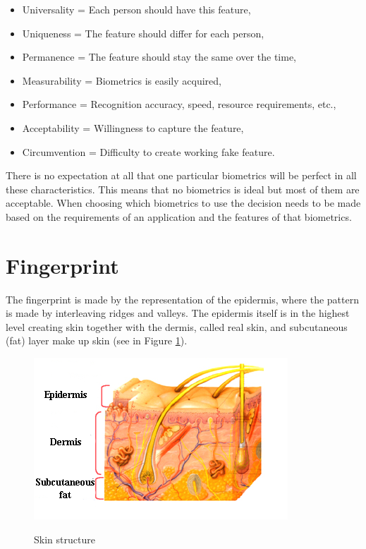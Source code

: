 \begin{itemize}
    \setlength\itemsep{0.2em}
    \item Universality = Each person should have this feature,
    \item Uniqueness = The feature should differ for each person,
    \item Permanence = The feature should stay the same over the time,
    \item Measurability = Biometrics is easily acquired,
    \item Performance = Recognition accuracy, speed, resource requirements, etc.,
    \item Acceptability = Willingness to capture the feature,
    \item Circumvention = Difficulty to create working fake feature. \cite{maltoni2009handbook} \cite{jain2007handbook} \cite{01BioPrednaska}
\end{itemize}

There is no expectation at all that one particular biometrics will be perfect in all these characteristics. This means that no biometrics is ideal but most of them are acceptable. When choosing which biometrics to use the decision needs to be made based on the requirements of an application and the features of that biometrics.

\section{Fingerprint}
The fingerprint is made by the representation of the epidermis, where the pattern is made by interleaving ridges and valleys. The epidermis itself is in the highest level creating skin together with the dermis, called real skin, and subcutaneous (fat) layer make up skin (see in Figure \ref{fig:skin}). \cite{jain2007handbook} \cite{holder2011fingerprint}

\begin{figure}[H]
    \centering
        {\includegraphics[width=0.6\linewidth]{obrazky-figures/skin.png}}\\
        \caption{Skin structure \cite{Skinanat76:online}}
        \label{fig:skin}
\end{figure}


